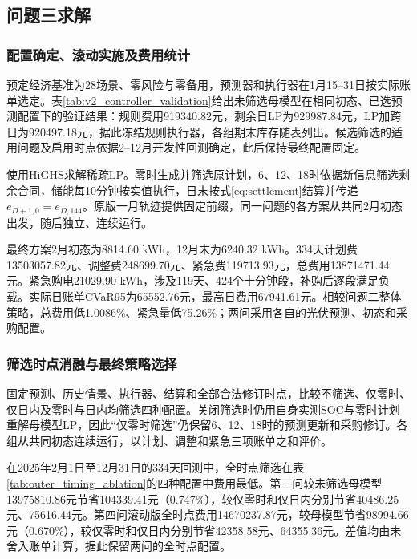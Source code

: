 \subsection{问题三求解}

\subsubsection{配置确定、滚动实施及费用统计}

预定经济基准为28场景、零风险与零备用，预测器和执行器在1月15--31日按实际账单选定。表\ref{tab:v2_controller_validation}给出未筛选母模型在相同初态、已选预测配置下的验证结果：规则费用919340.82元，剩余日LP为929987.84元，LP加跨日为920497.18元，据此冻结规则执行器，各组期末库存随表列出。候选筛选的适用问题及启用时点依据2--12月开发性回测确定，此后保持最终配置固定。



使用HiGHS求解稀疏LP。零时生成并筛选原计划，6、12、18时依据新信息筛选剩余合同，储能每10分钟按实值执行，日末按式\eqref{eq:settlement}结算并传递$e_{D+1,0}=e_{D,144}$。原版一月轨迹提供固定前缀，同一问题的各方案从共同2月初态出发，随后独立、连续运行。

最终方案2月初态为8814.60 kWh，12月末为6240.32 kWh。334天计划费13503057.82元、调整费248699.70元、紧急费119713.93元，总费用13871471.44元。紧急购电21029.90 kWh，涉及119天、424个十分钟段，补购后逐段满足负载。实际日账单CVaR95为65552.76元，最高日费用67941.61元。相较问题二整体策略，总费用低1.0086\%、紧急量低75.26\%；两问采用各自的光伏预测、初态和采购配置。

\subsubsection{筛选时点消融与最终策略选择}
\label{sec:q3_screening_ablation}

固定预测、历史情景、执行器、结算和全部合法修订时点，比较不筛选、仅零时、仅日内及零时与日内均筛选四种配置。关闭筛选时仍用自身实测SOC与零时计划重解母模型LP，因此“仅零时筛选”仍保留6、12、18时的预测更新和采购修订。各组从共同初态连续运行，以计划、调整和紧急三项账单之和评价。



在2025年2月1日至12月31日的334天回测中，全时点筛选在表\ref{tab:outer_timing_ablation}的四种配置中费用最低。第三问较未筛选母模型13975810.86元节省104339.41元（0.747\%），较仅零时和仅日内分别节省40486.25元、75616.44元。第四问滚动版全时点费用14670237.87元，较母模型节省98994.66元（0.670\%），较仅零时和仅日内分别节省42358.58元、64355.36元。差值均由未舍入账单计算，据此保留两问的全时点配置。

